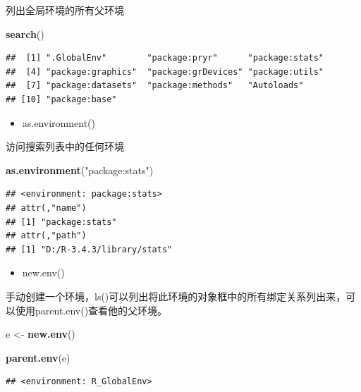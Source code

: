 \documentclass[]{book}
\newenvironment{Shaded}{\begin{snugshade}}{\end{snugshade}}
\newcommand{\KeywordTok}[1]{\textcolor[rgb]{0.13,0.29,0.53}{\textbf{#1}}}
\newcommand{\StringTok}[1]{\textcolor[rgb]{0.31,0.60,0.02}{#1}}
\newcommand{\NormalTok}[1]{#1}
\providecommand{\tightlist}{%
  \setlength{\itemsep}{0pt}\setlength{\parskip}{0pt}}
\begin{document}
列出全局环境的所有父环境

\begin{Shaded}
\begin{Highlighting}[]
\KeywordTok{search}\NormalTok{()}
\end{Highlighting}
\end{Shaded}

\begin{verbatim}
##  [1] ".GlobalEnv"        "package:pryr"      "package:stats"    
##  [4] "package:graphics"  "package:grDevices" "package:utils"    
##  [7] "package:datasets"  "package:methods"   "Autoloads"        
## [10] "package:base"
\end{verbatim}

\begin{itemize}
\tightlist
\item
  as.environment()
\end{itemize}

访问搜索列表中的任何环境

\begin{Shaded}
\begin{Highlighting}[]
\KeywordTok{as.environment}\NormalTok{(}\StringTok{"package:stats"}\NormalTok{)}
\end{Highlighting}
\end{Shaded}

\begin{verbatim}
## <environment: package:stats>
## attr(,"name")
## [1] "package:stats"
## attr(,"path")
## [1] "D:/R-3.4.3/library/stats"
\end{verbatim}

\begin{itemize}
\tightlist
\item
  new.env()
\end{itemize}

手动创建一个环境，ls()可以列出将此环境的对象框中的所有绑定关系列出来，可以使用parent.env()查看他的父环境。

\begin{Shaded}
\begin{Highlighting}[]
\NormalTok{e <-}\StringTok{ }\KeywordTok{new.env}\NormalTok{()}

\KeywordTok{parent.env}\NormalTok{(e)}
\end{Highlighting}
\end{Shaded}

\begin{verbatim}
## <environment: R_GlobalEnv>
\end{verbatim}
\end{document}
